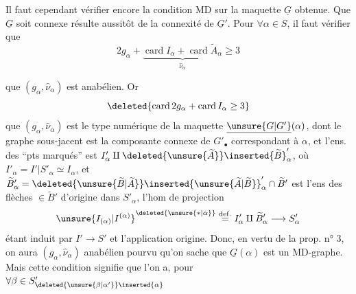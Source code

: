 Il faut cependant vérifier encore la condition MD sur la maquette $\underline G$ obtenue. Que $\underline G$ soit connexe résulte aussitôt de la connexité de $\underline G'$. Pour $\forall\alpha\in S$, il faut vérifier que
\[
2g_\alpha+\underbrace{\operatorname{card}I_\alpha+\operatorname{card}\widetilde A_\alpha}_{\widehat\nu_\alpha}\geq3
\]

 que $(g_\alpha,\widehat\nu_\alpha)$ est anabélien. Or
\[
\deleted{\operatorname{card}2g_\alpha+\operatorname{card}I_\alpha\geq3}
\]
 que $(g_\alpha,\widehat\nu_\alpha)$ est le type numérique de la maquette $\underline{\unsure{G|G'}}(\alpha)$, dont le graphe sous-jacent est la composante connexe de $G'_\bullet$ correspondant à $\alpha$, et l'ens. des ``pts marqués'' est $I'_\alpha\amalg\deleted{\unsure{\widetilde A}}\inserted{\widetilde B}'_\alpha$,  où $I'_\alpha=I'|S'_\alpha\simeq I_\alpha$, et $\widetilde B'_\alpha=\deleted{\unsure{\widetilde B|\widetilde A}}\inserted{\unsure{\widetilde A|\widetilde B}}'_\alpha\cap\widetilde B'$ est l'ens des flèches $\in\widetilde B'$ d'origine dans $S'_\alpha$, l'hom de projection
\[
\unsure{I_{(\alpha)}|I^{(\alpha)}}^{\deleted{\unsure{\ast|\alpha}}}\overset{\mathrm{def.}}{=}I'_\alpha\amalg\widetilde B'_\alpha\longrightarrow S'_\alpha
\]
étant induit par $I'\to S'$ et l'application origine. Donc, en vertu de la prop.  n° 3, on aura $(g_\alpha,\widehat\nu_\alpha)$ anabélien pourvu qu'on sache que $\underline G(\alpha)$ est un MD-graphe. Mais cette condition signifie que l'on a, pour $\forall\beta\in S'_{\deleted{\unsure{\beta|\alpha'}}\inserted{\alpha}}$

